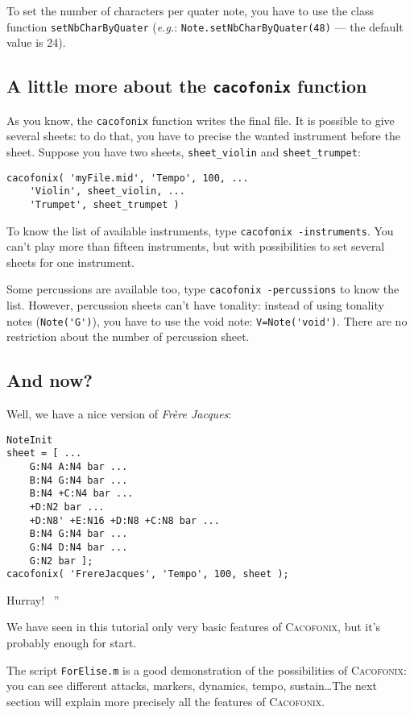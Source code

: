 \documentclass{article}
\newcommand{\cacofonix}{\textsc{Cacofonix}\xspace}
\newcommand{\frerejaques}{\emph{Fr\`ere Jacques}\xspace}
\newcommand{\file}[1]{\texttt{#1}\xspace}
\newcommand{\eg}{\emph{e.g.}\xspace}
\newenvironment{meenv}{ \par \noindent \makebox[6em][r]{ \textcolor{mecolor}{Me}: `` --~}}{~''}
\newcommand{ \me }[1]{%
\begin{meenv}%
	#1%
\end{meenv} }
\begin{document}
To set the number of characters per quater note, you have to use the class function \lstinline!setNbCharByQuater! (\eg: \lstinline!Note.setNbCharByQuater(48)! --- the default value is 24).

\subsection{A little more about the \lstinline!cacofonix! function}

As you know, the \lstinline!cacofonix! function writes the final file. It is possible to give several sheets: to do that, you have to precise the wanted instrument before the sheet. Suppose you have two sheets, \lstinline!sheet_violin! and \lstinline!sheet_trumpet!:
\begin{lstlisting}
cacofonix( 'myFile.mid', 'Tempo', 100, ...
	'Violin', sheet_violin, ...
	'Trumpet', sheet_trumpet )
\end{lstlisting}

To know the list of available instruments, type \lstinline!cacofonix -instruments!. You can't play more than fifteen instruments, but with possibilities to set several sheets for one instrument.

Some percussions are available too, type \lstinline!cacofonix -percussions! to know the list. However, percussion sheets can't have tonality: instead of using tonality notes (\lstinline!Note('G')!), you have to use the void note: \lstinline!V=Note('void')!. There are no restriction about the number of percussion sheet.

\subsection{And now?}

Well, we have a nice version of \frerejaques:
\begin{lstlisting}
NoteInit
sheet = [ ...
	G:N4 A:N4 bar ...
	B:N4 G:N4 bar ...
	B:N4 +C:N4 bar ...
	+D:N2 bar ...
	+D:N8' +E:N16 +D:N8 +C:N8 bar ...
	B:N4 G:N4 bar ...
	G:N4 D:N4 bar ...
	G:N2 bar ];
cacofonix( 'FrereJacques', 'Tempo', 100, sheet );
\end{lstlisting}

\me{Hurray!}

We have seen in this tutorial only very basic features of \cacofonix, but it's probably enough for start.

The script \file{ForElise.m} is a good demonstration of the possibilities of \cacofonix: you can see different attacks, markers, dynamics, tempo, sustain\dots The next section will explain more precisely all the features of \cacofonix.
\end{document}
